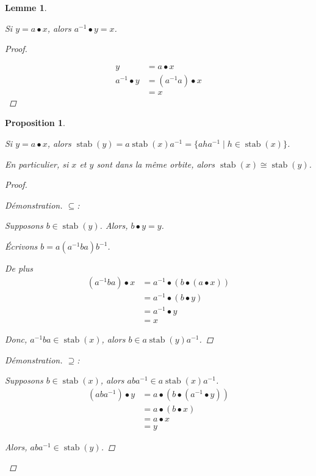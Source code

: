 \documentclass{report}
\newcommand*{\stab}{\operatorname{stab}}
\newtheorem*{lem}{Lemme}
\newtheorem*{prop}{Proposition}
\theoremstyle{definition}
\theoremstyle{remark}
\newenvironment*{subproof}[1][D\'emonstration]
{
\begin{proof}[#1]

}
{
	\renewcommand{\qedsymbol}{$\blacksquare$}
\end{proof}
\renewcommand{\qedsymbol}{$\square$}
}
\begin{document}
	
	\begin{lem}~

		Si $y = a \bullet x$, alors $a^{-1} \bullet y = x$.
		\begin{proof}~

			\begin{align*}
				y&= a \bullet x\\
				a^{-1} \bullet y&= (a^{-1}a) \bullet x\\
				&= x
			\end{align*}
		\end{proof}
	\end{lem}
	\begin{prop}~

		Si $y=a \bullet x$, alors $\stab(y) = a \stab(x) a^{-1} = \{aha^{-1} \mid h \in \stab(x)\}$.

		En particulier, si $x$ et $y$ sont dans la m\^eme orbite, alors $\stab(x) \cong \stab(y)$.
		\begin{proof}~

			\begin{subproof}{$\subseteq$:}~

				Supposons $b \in \stab(y)$. Alors, $b \bullet y = y$.

				\'Ecrivons $b = a(a^{-1}ba)b^{-1}$.

				De plus
				\begin{align*}
					(a^{-1}ba) \bullet x&= a^{-1} \bullet (b \bullet (a \bullet x))\\
					&= a^{-1} \bullet (b \bullet y)\\
					&= a^{-1} \bullet y\\
					&= x
				\end{align*}

				Donc, $a^{-1}ba \in \stab(x)$, alors $b \in a \stab(y) a^{-1}$.
			\end{subproof}
			\begin{subproof}{$\supseteq$:}~

				Supposons $b \in \stab(x)$, alors $aba^{-1} \in a \stab(x) a^{-1}$.
				\begin{align*}
					(aba^{-1}) \bullet y&= a \bullet(b \bullet (a^{-1} \bullet y))\\
					&= a \bullet (b \bullet x)\\
					&= a \bullet x\\
					&= y
				\end{align*}

				Alors, $aba^{-1} \in \stab(y)$.
			\end{subproof}


\end{proof}
\end{prop}
\end{document}
